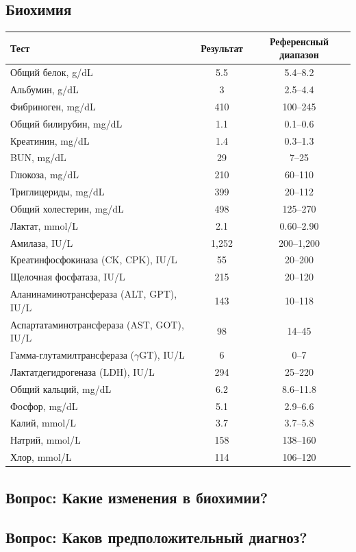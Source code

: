 \documentclass[a4paper,12pt]{book}
\begin{document}
\subsection*{Биохимия}
\begin{tabular}{lcc}
\toprule
Тест & Результат & Референсный диапазон \\
\midrule
Общий белок, g/dL & 5.5 & 5.4--8.2 \\
Альбумин, g/dL & 3 & 2.5--4.4 \\
Фибриноген, mg/dL & 410 & 100--245 \\
Общий билирубин, mg/dL & 1.1 & 0.1--0.6 \\
Креатинин, mg/dL & 1.4 & 0.3--1.3 \\
BUN, mg/dL & 29 & 7--25 \\
Глюкоза, mg/dL & 210 & 60--110 \\
Триглицериды, mg/dL & 399 & 20--112 \\
Общий холестерин, mg/dL & 498 & 125--270 \\
Лактат, mmol/L & 2.1 & 0.60--2.90 \\
Амилаза, IU/L & 1,252 & 200--1,200 \\
Креатинфосфокиназа (CK, CPK), IU/L & 55 & 20--200 \\
Щелочная фосфатаза, IU/L & 215 & 20--120 \\
Аланинаминотрансфераза (ALT, GPT), IU/L & 143 & 10--118 \\
Аспартатаминотрансфераза (AST, GOT), IU/L & 98 & 14--45 \\
Гамма-глутамилтрансфераза ($\gamma$GT), IU/L & 6 & 0--7 \\
Лактатдегидрогеназа (LDH), IU/L & 294 & 25--220 \\
Общий кальций, mg/dL & 6.2 & 8.6--11.8 \\
Фосфор, mg/dL & 5.1 & 2.9--6.6 \\
Калий, mmol/L & 3.7 & 3.7--5.8 \\
Натрий, mmol/L & 158 & 138--160 \\
Хлор, mmol/L & 114 & 106--120 \\
\bottomrule
\end{tabular}

\subsection*{Вопрос: Какие изменения в биохимии?}
\subsection*{Вопрос: Каков предположительный диагноз?}
\end{document}
